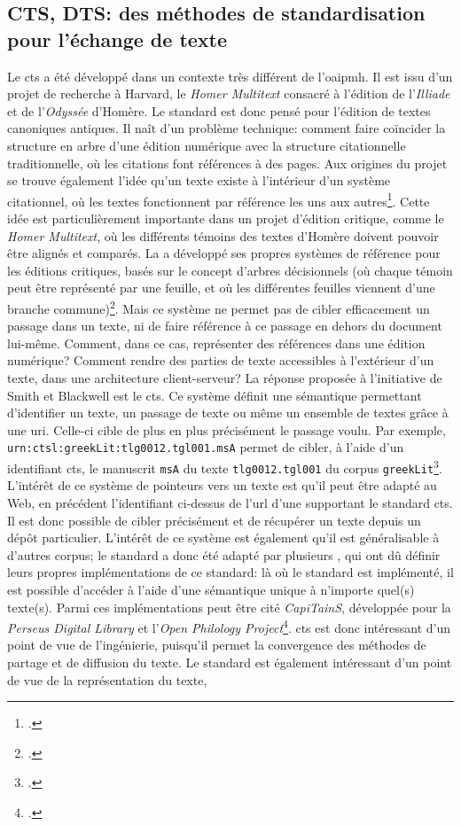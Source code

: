 \subsection{CTS, DTS: des méthodes de standardisation pour l'échange de texte}
Le \gls{cts} a été développé dans un contexte très différent de l'\gls{oaipmh}. Il est issu d'un projet de recherche à Harvard, le \textit{Homer Multitext} consacré à l'édition de l'\textit{Illiade} et de l'\textit{Odyssée} d'Homère. Le standard est donc pensé pour l'édition de textes canoniques antiques. Il naît d'un problème technique: comment faire coïncider la structure en arbre d'une édition numérique avec la structure citationnelle traditionnelle, où les citations font références à des pages. Aux origines du projet se trouve également l'idée qu'un texte existe à l'intérieur d'un système citationnel, où les textes fonctionnent par référence les uns aux autres\footcite{smith_four_2012}. Cette idée est particulièrement importante dans un projet d'édition critique, comme le \textit{Homer Multitext}, où les différents témoins des textes d'Homère doivent pouvoir être alignés et comparés. La \tei{} a développé ses propres systèmes de référence pour les éditions critiques, basés sur le concept d'arbres décisionnels (où chaque témoin peut être représenté par une feuille, et où les différentes feuilles viennent d'une branche commune)\footcite{tei_consortium_p5_2022}. Mais ce système ne permet pas de cibler efficacement un passage dans un texte, ni de faire référence à ce passage en dehors du document lui-même. Comment, dans ce cas, représenter des références dans une édition numérique? Comment rendre des parties de texte accessibles à l'extérieur d'un texte, dans une architecture client-serveur? La réponse proposée à l'initiative de Smith et Blackwell est le \gls{cts}. Ce système définit une sémantique permettant d'identifier un texte, un passage de texte ou même un ensemble de textes grâce à une \gls{uri}. Celle-ci cible de plus en plus précisément le passage voulu. Par exemple, \texttt{urn:ctsl:greekLit:tlg0012.tgl001.msA} permet de cibler, à l'aide d'un identifiant \gls{cts}, le manuscrit \texttt{msA} du texte \texttt{tlg0012.tgl001} du corpus \texttt{greekLit}\footcite{smith_four_2012}. L'intérêt de ce système de pointeurs vers un texte est qu'il peut être adapté au Web, en précédent l'identifiant ci-dessus de l'\gls{url} d'une \api{} supportant le standard \gls{cts}. Il est donc possible de cibler précisément et de récupérer un texte depuis un dépôt particulier. L'intérêt de ce système est également qu'il est généralisable à d'autres corpus; le standard a donc été adapté par plusieurs \api{}, qui ont dû définir leurs propres implémentations de ce standard: là où le standard est implémenté, il est possible d'accéder à l'aide d'une sémantique unique à n'importe quel(s) texte(s). Parmi ces implémentations peut être cité \textit{CapiTainS}, développée pour la \textit{Perseus Digital Library} et l'\textit{Open Philology Project}\footcite{almas_continuous_2018}. \gls{cts} est donc intéressant d'un point de vue de l'ingénierie, puisqu'il permet la convergence des méthodes de partage et de diffusion du texte. Le standard est également intéressant d'un point de vue de la représentation du texte, 